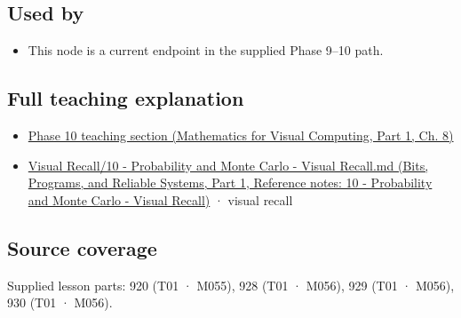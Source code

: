 \subsection{Used by}\label{appendix-f0437ea55a47-used-by}

\hypertarget{appendix-f0437ea55a47-used-by}{}

\begin{itemize}
\tightlist
\item
  This node is a current endpoint in the supplied Phase 9--10 path.
\end{itemize}

\subsection{Full teaching explanation}\label{appendix-f0437ea55a47-full-teaching-explanation}

\hypertarget{appendix-f0437ea55a47-full-teaching-explanation}{}

\begin{itemize}
\tightlist
\item
  \href{../02-Mathematics-for-Visual-Computing-P01/main.pdf\#02-foundations-ii-ch024-waiting-times-event-counts-and-covariance-geometry}{Phase 10 teaching section (Mathematics for Visual Computing, Part 1, Ch. 8)}
\item
  \href{../01-Bits-Programs-and-Reliable-Systems-P01/main.pdf\#appendix-cb5af353ef77}{Visual Recall/10 - Probability and Monte Carlo - Visual Recall.md (Bits, Programs, and Reliable Systems, Part 1, Reference notes: 10 - Probability and Monte Carlo - Visual Recall)} · visual recall
\end{itemize}

\subsection{Source coverage}\label{appendix-f0437ea55a47-source-coverage}

\hypertarget{appendix-f0437ea55a47-source-coverage}{}

Supplied lesson parts: 920 (T01 · M055), 928 (T01 · M056), 929 (T01 · M056), 930 (T01 · M056).
